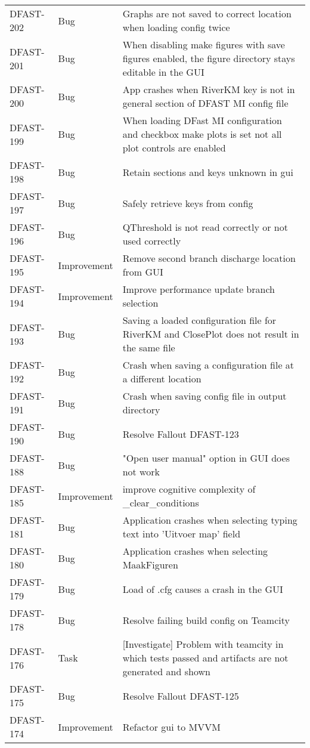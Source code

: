 \documentclass[git]{deltares_manual}
\begin{document}
\begin{longtable}{l|l|p{8cm}}
DFAST-202 & Bug & Graphs are not saved to correct location when loading config twice \\
DFAST-201 & Bug & When disabling make figures with save figures enabled, the figure directory stays editable in the GUI \\
DFAST-200 & Bug & App crashes when RiverKM key is not in general section of DFAST MI config file \\
DFAST-199 & Bug & When loading DFast MI configuration and checkbox make plots is set not all plot controls are enabled \\
DFAST-198 & Bug & Retain sections and keys unknown in gui \\
DFAST-197 & Bug & Safely retrieve keys from config \\
DFAST-196 & Bug & QThreshold is not read correctly or not used correctly \\
DFAST-195 & Improvement & Remove second branch discharge location from GUI \\
DFAST-194 & Improvement & Improve performance update branch selection \\
DFAST-193 & Bug & Saving a loaded configuration file for RiverKM and ClosePlot does not result in the same file \\
DFAST-192 & Bug & Crash when saving a configuration file at a different location \\
DFAST-191 & Bug & Crash when saving config file in output directory \\
DFAST-190 & Bug & Resolve Fallout DFAST-123 \\
DFAST-188 & Bug & "Open user manual" option in GUI does not work \\
DFAST-185 & Improvement & improve cognitive complexity of \_clear\_conditions \\
DFAST-181 & Bug & Application crashes when selecting typing text into 'Uitvoer map' field \\
DFAST-180 & Bug & Application crashes when selecting MaakFiguren \\
DFAST-179 & Bug & Load of .cfg causes a crash in the GUI \\
DFAST-178 & Bug & Resolve failing build config on Teamcity \\
DFAST-176 & Task & [Investigate] Problem with teamcity in which tests passed and artifacts are not generated and shown \\
DFAST-175 & Bug & Resolve Fallout DFAST-125  \\
DFAST-174 & Improvement & Refactor gui to MVVM \\

\end{longtable}
\end{document}
